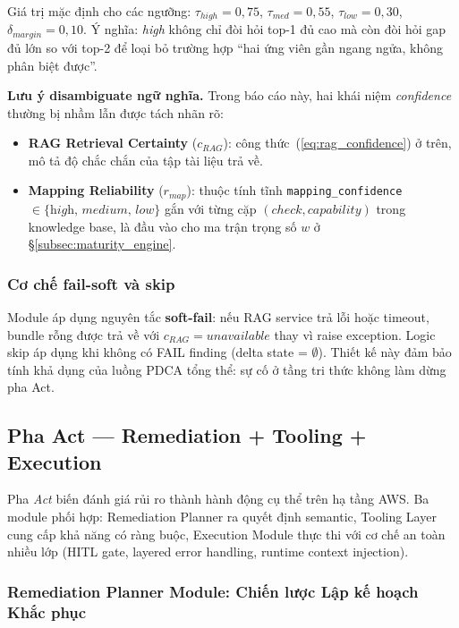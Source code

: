 Giá trị mặc định cho các ngưỡng: $\tau_{high}=0{,}75$, $\tau_{med}=0{,}55$, $\tau_{low}=0{,}30$, $\delta_{margin}=0{,}10$. Ý nghĩa: \textit{high} không chỉ đòi hỏi top-1 đủ cao mà còn đòi hỏi gap đủ lớn so với top-2 để loại bỏ trường hợp ``hai ứng viên gần ngang ngửa, không phân biệt được''.

\textbf{Lưu ý disambiguate ngữ nghĩa.} Trong báo cáo này, hai khái niệm \textit{confidence} thường bị nhầm lẫn được tách nhãn rõ:
\begin{itemize}
  \item \textbf{RAG Retrieval Certainty} ($c_{RAG}$): công thức~(\ref{eq:rag_confidence}) ở trên, mô tả độ chắc chắn của tập tài liệu trả về.
  \item \textbf{Mapping Reliability} ($r_{map}$): thuộc tính tĩnh \texttt{mapping\_confidence} $\in \{\textit{high, medium, low}\}$ gắn với từng cặp $(check, capability)$ trong knowledge base, là đầu vào cho ma trận trọng số $w$ ở \S\ref{subsec:maturity_engine}.
\end{itemize}

\subsubsection*{Cơ chế fail-soft và skip}
Module áp dụng nguyên tắc \textbf{soft-fail}: nếu RAG service trả lỗi hoặc timeout, bundle rỗng được trả về với $c_{RAG}=\textit{unavailable}$ thay vì raise exception. Logic skip áp dụng khi không có FAIL finding (delta state = $\emptyset$). Thiết kế này đảm bảo tính khả dụng của luồng PDCA tổng thể: sự cố ở tầng tri thức không làm dừng pha Act.

\subsection{Pha Act --- Remediation + Tooling + Execution}
\label{sec:phase_act}

Pha \textit{Act} biến đánh giá rủi ro thành hành động cụ thể trên hạ tầng AWS. Ba module phối hợp: Remediation Planner ra quyết định semantic, Tooling Layer cung cấp khả năng có ràng buộc, Execution Module thực thi với cơ chế an toàn nhiều lớp (HITL gate, layered error handling, runtime context injection).

\subsubsection*{Remediation Planner Module: Chiến lược Lập kế hoạch Khắc phục}
\label{sub:remediation_module}

